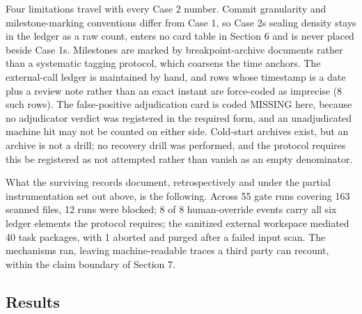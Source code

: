 \documentclass[
  english,
]{article}
\begin{document}
Four limitations travel with every Case 2 number. Commit granularity and milestone-marking conventions differ from Case 1, so Case 2\textquotesingle s sealing density stays in the ledger as a raw count, enters no card table in Section 6 and is never placed beside Case 1\textquotesingle s. Milestones are marked by breakpoint-archive documents rather than a systematic tagging protocol, which coarsens the time anchors. The external-call ledger is maintained by hand, and rows whose timestamp is a date plus a review note rather than an exact instant are force-coded as imprecise (8 such rows). The false-positive adjudication card is coded MISSING here, because no adjudicator verdict was registered in the required form, and an unadjudicated machine hit may not be counted on either side. Cold-start archives exist, but an archive is not a drill; no recovery drill was performed, and the protocol requires this be registered as not attempted rather than vanish as an empty denominator.

What the surviving records document, retrospectively and under the partial instrumentation set out above, is the following. Across 55 gate runs covering 163 scanned files, 12 runs were blocked; 8 of 8 human-override events carry all six ledger elements the protocol requires; the sanitized external workspace mediated 40 task packages, with 1 aborted and purged after a failed input scan. The mechanisms ran, leaving machine-readable traces a third party can recount, within the claim boundary of Section 7.

\subsection{Results}\label{results}
\end{document}
